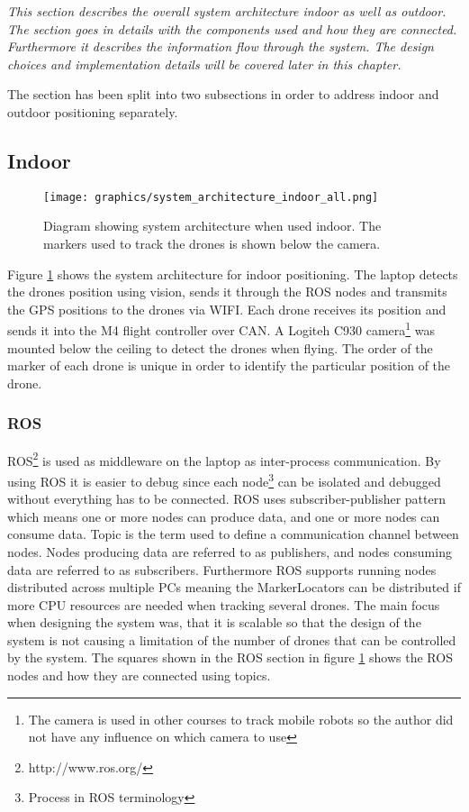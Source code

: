 \textit{This section describes the overall system architecture indoor as well as outdoor. The section goes in details with the components used and how they are connected. Furthermore it describes the information flow through the system. The design choices and implementation details will be covered later in this chapter.}

The section has been split into two subsections in order to address indoor and outdoor positioning separately.

\subsection{Indoor} \label{sec:system_architecture_indoor}

\begin{figure}[H]
    \center
    \texttt{[image: graphics/system\_architecture\_indoor\_all.png]}
    \caption{Diagram showing system architecture when used indoor. The markers used to track the drones is shown below the camera.}
    \label{fig:indoor_information_flow}
\end{figure} 
Figure \ref{fig:indoor_information_flow} shows the system architecture for indoor positioning. The laptop detects the drones position using vision, sends it through the ROS nodes and transmits the GPS positions to the drones via WIFI.
Each drone receives its position and sends it into the M4 flight controller over \ac{CAN}.
A Logiteh C930 camera\footnote{The camera is used in other courses to track mobile robots so the author did not have any influence on which camera to use} was mounted below the ceiling to detect the drones when flying. The order of the marker of each drone is unique in order to identify the particular position of the drone.


\subsubsection*{ROS}
\ac{ROS}\footnote{http://www.ros.org/} is used as middleware on the laptop as inter-process communication. By using ROS it is easier to debug since each node\footnote{Process in \ac{ROS} terminology} can be isolated and debugged without everything has to be connected. \ac{ROS} uses subscriber-publisher pattern which means one or more nodes can produce data, and one or more nodes can consume data. Topic is the term used to define a communication channel between nodes. Nodes producing data are referred to as publishers, and nodes consuming data are referred to as subscribers.
Furthermore \ac{ROS} supports running nodes distributed across multiple PCs meaning the MarkerLocators can be distributed if more CPU resources are needed when tracking several drones. The main focus when designing the system was, that it is scalable so that the design of the system is not causing a limitation of the number of drones that can be controlled by the system.
The squares shown in the \ac{ROS} section in figure \ref{fig:indoor_information_flow} shows the \ac{ROS} nodes and how they are connected using topics.



